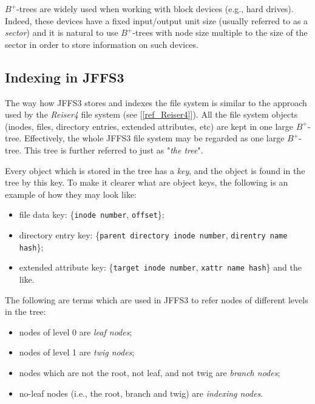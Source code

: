 \documentclass[12pt,a4paper,oneside,titlepage]{article}
\begin{document}
\mbox{$B^+$-trees} are widely used when working with block devices (e.g., hard
drives). Indeed, these devices have a fixed input/output unit size (usually
referred to as a \emph{sector}) and it is natural to use \mbox{$B^+$-trees}
with node size multiple to the size of the sector in order to store information
on such devices.

%
%
\subsection{Indexing in JFFS3} \label{ref_SectionIndexing}

The way how JFFS3 stores and indexes the file system is similar to the approach
used by the \emph{Reiser4} file system (see [\ref{ref_Reiser4}]). All the file
system objects (inodes, files, directory entries, extended attributes, etc) are
kept in one large \mbox{$B^+$-tree}. Effectively, the whole JFFS3 file system
may be regarded as one large \mbox{$B^+$-tree}.  This tree is further referred
to just as "\emph{the tree}".

Every object which is stored in the tree has a \emph{key}, and the object is
found in the tree by this key. To make it clearer what are object keys, the
following is an example of how they may look like:

\begin{itemize}

\item file data key: \{\texttt{inode number}, \texttt{offset}\};

\item directory entry key: \{\texttt{parent directory inode number},
\texttt{direntry name hash}\};

\item extended attribute key: \{\texttt{target inode number}, \texttt{xattr
name hash}\} and the like.

\end{itemize}

The following are terms which are used in JFFS3 to refer nodes of different
levels in the tree:

\begin{itemize}

\item nodes of level 0 are \emph{leaf nodes};

\item nodes of level 1 are \emph{twig nodes};

\item nodes which are not the root, not leaf, and not twig are \emph{branch
nodes};

\item \mbox{no-leaf} nodes (i.e., the root, branch and twig) are
\emph{indexing nodes}.

\end{itemize}
\end{document}
